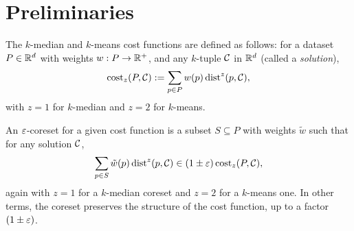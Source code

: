 \section{Preliminaries}

The $k$-median and $k$-means cost functions are defined as follows: 
for a dataset $P \in \mathbb{R}^d$ with weights $w : P \rightarrow \mathbb{R}^+$, and any $k$-tuple $\mathcal C$ in $\mathbb{R}^d$ (called a \emph{solution}), 
\[\operatorname{cost}_z(P, \mathcal C) := \sum_{p \in P} w(p) \operatorname{dist}^z(p, \mathcal C),\]
with $z=1$ for $k$-median and $z=2$ for $k$-means.

An $\varepsilon$-coreset for a given cost function is a subset $S \subseteq P$ with weights $\tilde w$ such that
for any solution $\mathcal C$,
\[\sum_{p \in S} \tilde w(p) \operatorname{dist}^z(p, \mathcal C) \in (1 \pm \varepsilon) \operatorname{cost}_z(P, \mathcal C),\]
again with $z=1$ for a $k$-median coreset and $z=2$ for a $k$-means one.
In other terms, the coreset preserves the structure of the cost function, up to a factor $(1\pm \varepsilon)$.



%
%

